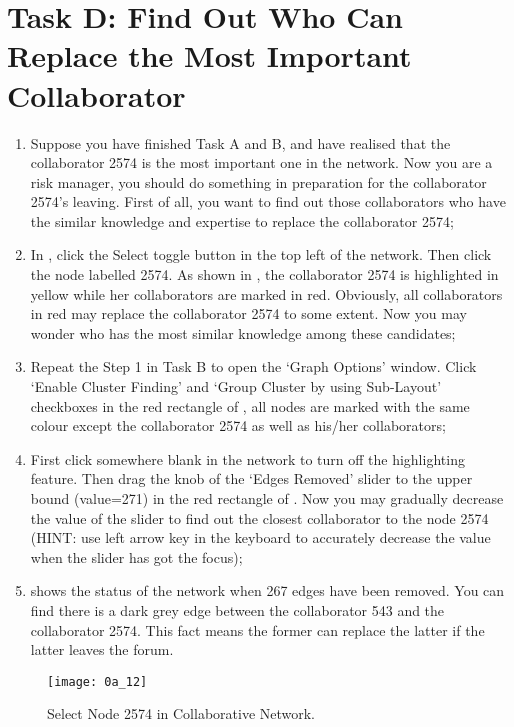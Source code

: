 \section{Task D: Find Out Who Can Replace the Most Important Collaborator}
\begin{enumerate}
	\item Suppose you have finished Task A and B, and have realised that the collaborator 2574 is the most important one in the network. Now you are a risk manager, you should do something in preparation for the collaborator 2574's leaving. First of all, you want to find out those collaborators who have the similar knowledge and expertise to replace the collaborator 2574; \\
	\item In , click the Select toggle button in the top left of the network. Then click the node labelled 2574. As shown in , the collaborator 2574 is highlighted in yellow while her collaborators are marked in red. Obviously, all collaborators in red may replace the collaborator 2574 to some extent. Now you may wonder who has the most similar knowledge among these candidates; \\
	\item Repeat the Step 1 in Task B to open the `Graph Options' window. Click `Enable Cluster Finding' and `Group Cluster by using Sub-Layout' checkboxes in the red rectangle of , all nodes are marked with the same colour except the collaborator 2574 as well as his/her collaborators; \\
	\item First click somewhere blank in the network to turn off the highlighting feature. Then drag the knob of the `Edges Removed' slider to the upper bound (value=271) in the red rectangle of . Now you may gradually decrease the value of the slider to find out the closest collaborator to the node 2574 (HINT: use left arrow key in the keyboard to accurately decrease the value when the slider has got the focus); \\
	\item {} shows the status of the network when 267 edges have been removed. You can find there is a dark grey edge between the collaborator 543 and the collaborator 2574. This fact means the former can replace the latter if the latter leaves the forum.
\end{enumerate}

\begin{figure}[!htb]
  \centering
  \texttt{[image: 0a\_12]}
  \caption{Select Node 2574 in Collaborative Network.}
  \label{Figure:0a_12}
\end{figure}

